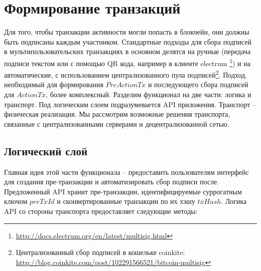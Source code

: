 \documentclass[specification,annotation]{itmo-student-thesis}
\begin{document}
\section{Формирование транзакций}

Для того, чтобы транзакции активности могли попасть в блокчейн, они
должны быть подписаны каждым участником. Стандартные подходы для сбора
подписей в мультипользовательских транзакциях в основном делятся на
ручные (передача подписи текстом или с помощью QR кода, например в
клиенте
electrum \footnote{\url{http://docs.electrum.org/en/latest/multisig.html}})
и на автоматические, с использованием централизованного пула
подписей\footnote{Централизованный сбор подписей в кошельке coinkite:
  \url{http://blog.coinkite.com/post/102291566521/bitcoin-multisig}}. Подход,
необходимый для формирования $PreActionTx$ и последующего сбора
подписей для $ActionTx$, более комплексный. Разделим функционал на две
части: логика и транспорт. Под логическим слоем подразумевается API
приложения. Транспорт -- физическая реализация. Мы рассмотрим
возможные решения транспорта, связанные с централизованными серверами
и децентрализованной сетью.

\subsection{Логический слой}

Главная идея этой части функционала -- предоставить пользователям
интерфейс для создания пре-транзакции и автоматизировать сбор подписи
после. Предложенный API хранит пре-транзакции, идентифицируемые
суррогатным ключом $preTxId$ и сконвертированные транзакции по их
хэшу $txHash$. Логика API со стороны транспорта предоставляет
следующие методы:
\end{document}
